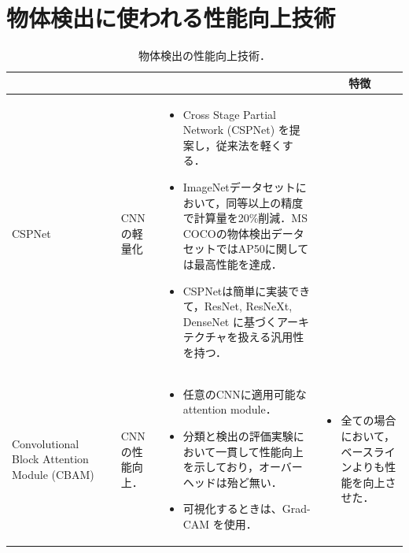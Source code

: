 \documentclass[originalpaper]{jsaiart}     %
\begin{document}
\section{物体検出に使われる性能向上技術}
\begin{table}
    \caption{物体検出の性能向上技術．}
    \label{tbl-option}
    \begin{center}
        \setlength{\tabcolsep}{3pt}
        \footnotesize
        \begin{tabularx}{\linewidth}{Xp{1.5cm}Xp{7cm}X} \toprule
            \centering{モデル名称} & \centering{文献} & \centering{用途} & \centering{概要} & \multicolumn{1}{c}{特徴} \\ \midrule

            CSPNet & \cite{WLWCHY20} & CNNの軽量化 & 
            \begin{itemize}
                \vspace{-0.7\baselineskip}
                \setlength{\leftskip}{-3mm}
                \item Cross Stage Partial Network (CSPNet) を提案し，従来法を軽くする．
                \item ImageNetデータセットにおいて，同等以上の精度で計算量を20\%削減．MS COCOの物体検出データセットではAP50に関しては最高性能を達成．
                \item CSPNetは簡単に実装できて，ResNet, ResNeXt, DenseNet に基づくアーキテクチャを扱える汎用性を持つ．
            \end{itemize}
            &
            \\

            Convolutional Block Attention Module (CBAM) & \cite{WPLK18} & CNNの性能向上． & 
            \begin{itemize}
                \vspace{-0.7\baselineskip}
                \setlength{\leftskip}{-3mm}
                \item 任意のCNNに適用可能な attention module．
                \item 分類と検出の評価実験において一貫して性能向上を示しており，オーバーヘッドは殆ど無い．
                \item 可視化するときは、Grad-CAM を使用．
            \end{itemize}
            &
            \begin{itemize}
                \vspace{-0.7\baselineskip}
                \setlength{\leftskip}{-3mm}
                \item 全ての場合において，ベースラインよりも性能を向上させた．
            \end{itemize}
            \\


\end{tabularx}
\end{center}
\end{table}
\end{document}
